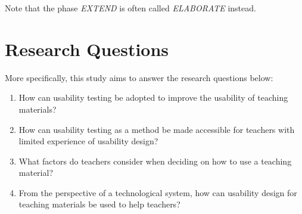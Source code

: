 Note that the phase \textit{EXTEND} is often called \textit{ELABORATE} instead.

\section{Research Questions}
More specifically, this study aims to answer the research questions below:

\begin{enumerate}
	\item How can usability testing be adopted to improve the usability of teaching materials?
	\item How can usability testing as a method be made accessible for teachers with limited experience of usability design?
	\item What factors do teachers consider when deciding on how to use a teaching material?
	\item From the perspective of a technological system, how can usability design for teaching materials be used to help teachers?
\end{enumerate}

